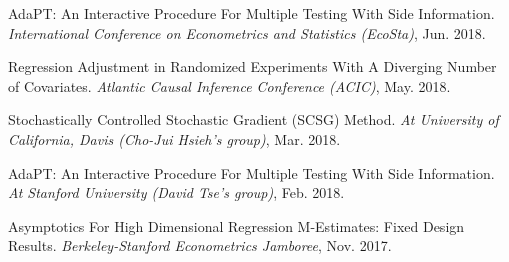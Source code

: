 \documentclass{article}
\begin{document}
\vspace{2mm}
AdaPT: An Interactive Procedure For Multiple Testing With Side Information. \emph{International Conference on Econometrics and Statistics (EcoSta)}, Jun. 2018.

\vspace{2mm}
Regression Adjustment in Randomized Experiments With A Diverging Number of Covariates. \emph{Atlantic Causal Inference Conference (ACIC)}, May. 2018.

\vspace{2mm}
Stochastically Controlled Stochastic Gradient (SCSG) Method. \emph{At University of California, Davis (Cho-Jui Hsieh's group)}, Mar. 2018.

\vspace{2mm}
AdaPT: An Interactive Procedure For Multiple Testing With Side Information. \emph{At Stanford University (David Tse's group)}, Feb. 2018.

\vspace{2mm}
Asymptotics For High Dimensional Regression M-Estimates: Fixed Design Results. \emph{Berkeley-Stanford Econometrics Jamboree}, Nov. 2017. 

\vspace{5mm}








\end{document}
